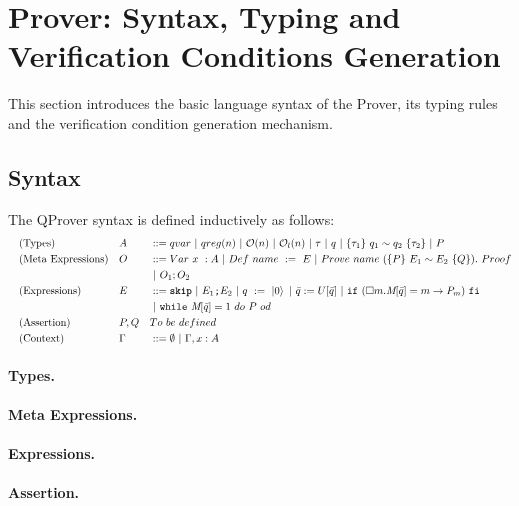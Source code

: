 
\section{Prover: Syntax, Typing and Verification Conditions Generation}
This section introduces the basic language syntax of the Prover, its typing rules and the verification condition generation mechanism. 

\subsection{Syntax}
\begin{definition}[Syntax] 
\label{def:syntax}
The QProver syntax is defined inductively as follows:
\begin{align*}
    & && \textrm{(Types)}               && A &&::= qvar ~|~ qreg(n) ~|~ \mathcal{O}(n) ~|~ \mathcal{O}_l(n) ~|~ \tau ~|~ q ~|~ \{\tau_1\} ~q_1 \sim q_2~\{\tau_2\} ~|~ P \\
    & && \textrm{(Meta Expressions)}    && O &&::= Var~x~:A ~|~ Def ~name~:=~E ~|~Prove~ name~(\{P\} ~E_1 \sim E_2~\{Q\}). ~Proof \\& && && && ~|~ O_1;O_2\\
    & && \textrm{(Expressions)}     && E &&::= \textbf{\texttt{skip}} ~|~ \texttt{$E_1$;$E_2$} ~|~ q~:=~\ket{0} ~|~ \bar{q} :=U[\bar{q}] ~|~ \texttt{if} ~(\square m . \textit{M}[\bar{q}] = m\rightarrow P_m) ~\texttt{fi} \\& && && &&
    ~|~ \texttt{while} ~\textit{M}[\bar{q}] = 1 ~do~ P ~od \\
    & && \textrm{(Assertion)}           && P,Q && To ~be~defined \\
    & && \textrm{(Context)} && \Gamma && ::= \emptyset~|~ \Gamma , x:A
\end{align*}
\end{definition}

\paragraph{Types.}
\paragraph{Meta Expressions.}
\paragraph{Expressions.}
\paragraph{Assertion.}

